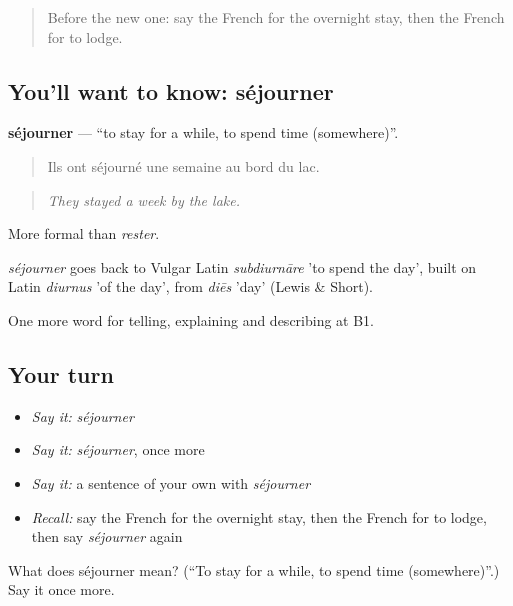 \label{lesson:FR-C424-sejourner}



\begin{quote}
Before the new one: say the French for the overnight stay, then the French for to lodge.
\end{quote}

\subsection*{You'll want to know: séjourner}
\textbf{séjourner} — \textquotedblleft{}to stay for a while, to spend time (somewhere)\textquotedblright{}.

\begin{quote}
Ils ont séjourné une semaine au bord du lac.
\end{quote}

\begin{quote}
\emph{They stayed a week by the lake.}
\end{quote}

More formal than \emph{rester}.

\begin{cousinweb}
\emph{séjourner} goes back to Vulgar Latin \emph{subdiurnāre} 'to spend the day', built on Latin \emph{diurnus} 'of the day', from \emph{diēs} 'day' (Lewis \& Short).
\end{cousinweb}

\begin{grammarlens}[title={What you've built}]
One more word for telling, explaining and describing at B1.
\end{grammarlens}

\subsection*{Your turn}
\begin{itemize}
\raggedright
  \item \emph{Say it:} \emph{séjourner}
  \item \emph{Say it:} \emph{séjourner}, once more
  \item \emph{Say it:} a sentence of your own with \emph{séjourner}
  \item \emph{Recall:} say the French for the overnight stay, then the French for to lodge, then say \emph{séjourner} again
\end{itemize}

\begin{tcolorbox}[breakable,colback=teal!4,colframe=teal!35!black,title={Before you move on}]
What does séjourner mean? (\textquotedblleft{}To stay for a while, to spend time (somewhere)\textquotedblright{}.) Say it once more.
\end{tcolorbox}
